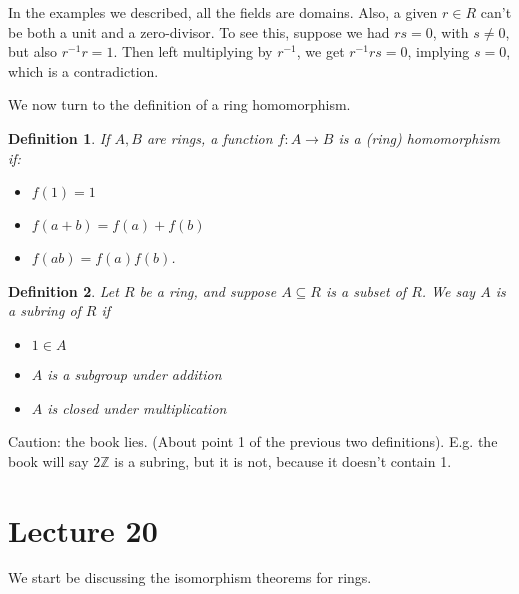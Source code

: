\documentclass[12pt]{article}
\newtheorem*{definition}{Definition}
\def\ZZ{\mathbb{Z}}
\begin{document}
 In the examples we described, all the fields are domains.  Also, a given $r \in R$ can't be both a unit and a zero-divisor.  To see this, suppose we had $rs = 0$, with $s \neq 0$, but also $r^{-1} r = 1$.  Then left multiplying by $r^{-1}$, we get $r^{-1} rs = 0$, implying $s = 0$, which is a contradiction.

 We now turn to the definition of a ring homomorphism.

 \begin{definition}
 If $A, B$ are rings, a function $f: A \to B$ is a (ring) homomorphism if:
 \begin{itemize}
   \item $f(1) = 1$
    \item $f(a+b) = f(a) + f(b)$
    \item $f(ab) = f(a) f(b)$.
 \end{itemize}
 \end{definition}

 \begin{definition}
   Let $R$ be a ring, and suppose $A \subseteq R$ is a subset of $R$.  We say $A$ is a subring of $R$ if
   \begin{itemize}
     \item $1 \in A$
      \item $A$ is a subgroup under addition
      \item $A$ is closed under multiplication
   \end{itemize}
 \end{definition}

 Caution: the book lies.  (About point 1 of the previous two definitions).  E.g. the book will say $2 \ZZ$ is a subring, but it is not, because it doesn't contain 1.



 \section{Lecture 20}

 We start be discussing the isomorphism theorems for rings.
\end{document}

